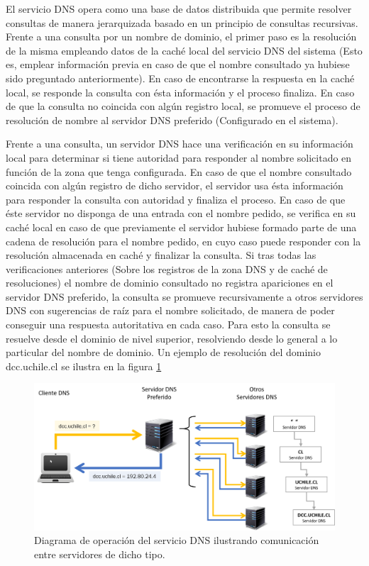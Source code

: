 \begin{intro}
El servicio DNS \cite{rfc:1034, rfc:1035} opera como una base de datos distribuida que permite resolver consultas de manera jerarquizada basado en un principio de consultas recursivas. Frente a una consulta por un nombre de dominio, el primer paso es la resolución de la misma empleando datos de la caché local del servicio DNS del sistema (Esto es, emplear información previa en caso de que el nombre consultado ya hubiese sido preguntado anteriormente). En caso de encontrarse la respuesta en la caché local, se responde la consulta con ésta información y el proceso finaliza. En caso de que la consulta no coincida con algún registro local, se promueve el proceso de resolución de nombre al servidor DNS preferido (Configurado en el sistema).  

Frente a una consulta, un servidor DNS hace una verificación en su información local para determinar si tiene autoridad para responder al nombre solicitado en función de la zona que tenga configurada. En caso de que el nombre consultado coincida con algún registro de dicho servidor, el servidor usa ésta información para responder la consulta con autoridad y finaliza el proceso. En caso de que éste servidor no disponga de una entrada con el nombre pedido, se verifica en su caché local en caso de que previamente el servidor hubiese formado parte de una cadena de resolución para el nombre pedido, en cuyo caso puede responder con la resolución almacenada en caché y finalizar la consulta. Si tras todas las verificaciones anteriores (Sobre los registros de la zona DNS y de caché de resoluciones) el nombre de dominio consultado no registra apariciones en el servidor DNS preferido, la consulta se promueve recursivamente a otros servidores DNS con sugerencias de raíz para el nombre solicitado, de manera de poder conseguir una respuesta autoritativa en cada caso. Para esto la consulta se resuelve desde el dominio de nivel superior, resolviendo desde lo general a lo particular del nombre de dominio. Un ejemplo de resolución del dominio dcc.uchile.cl se ilustra en la figura \ref{fig:dns}

\begin{figure}[!h]
	\centering
	\includegraphics[scale=0.75]{imagenes/dns-system.png}
	\caption{Diagrama de operación del servicio DNS ilustrando comunicación entre servidores de dicho tipo.}
	\label{fig:dns}
\end{figure}


\end{intro}
